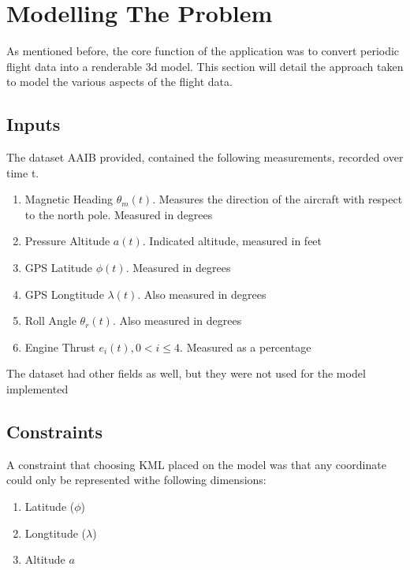 
\chapter{Modelling The Problem} %

\label{ch:model} %

As mentioned before, the core function of the application was to convert periodic flight data into a
renderable 3d model. This section will detail the approach taken to model the various aspects of the flight data.\\


\section{Inputs}

The dataset AAIB provided, contained the following measurements, recorded over time t.
\begin{enumerate}
  \item Magnetic Heading $\theta_{m}(t)$. Measures the direction of the aircraft with respect to the north pole. Measured in degrees
  \item Pressure Altitude $a(t)$. Indicated altitude, measured in feet
  \item GPS Latitude $\phi(t)$. Measured in degrees
  \item GPS Longtitude $\lambda(t)$. Also measured in degrees
  \item Roll Angle $\theta_{r}(t)$. Also measured in degrees
  \item Engine Thrust $e_{i}(t), 0 < i \leq 4$. Measured as a percentage
\end{enumerate}

The dataset had other fields as well, but they were not used for the model implemented

\section{Constraints}

A constraint that choosing KML placed on the model was that any coordinate could only be represented withe following dimensions:
\begin{enumerate}
\item Latitude ($\phi$)
\item Longtitude ($\lambda$)
\item Altitude $a$
\end{enumerate}

